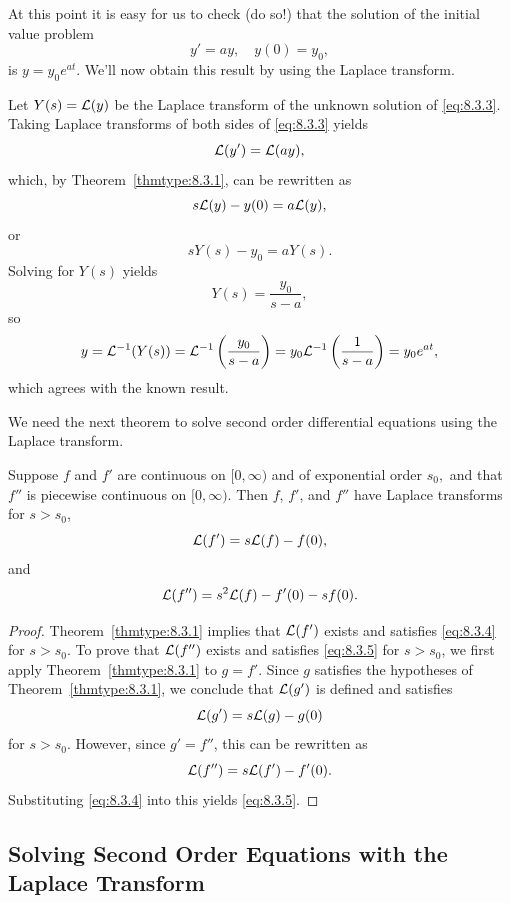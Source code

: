 \documentclass{ximera}
\begin{document}
At this point it is easy for us to check (do so!)
that the solution of the
initial value problem
\begin{equation}\label{eq:8.3.3}
y'=ay, \quad  y(0)=y_0,
\end{equation}
 is $y=y_0e^{at}$.
We'll now obtain this result by using the Laplace transform.

Let $Y(s)={\cal L}(y)$ be the Laplace transform of the unknown solution
of \eqref{eq:8.3.3}. Taking Laplace transforms of both sides of
\eqref{eq:8.3.3} yields
$$
{\cal L}(y')={\cal L}(ay),
$$
which, by Theorem~\ref{thmtype:8.3.1}, can be rewritten as
$$
s{\cal L}(y)-y(0)=a{\cal L}(y),
$$
or
$$
sY(s)-y_0=aY(s).
$$
Solving for $Y(s)$ yields
$$
Y(s)=\frac{y_0}{s-a},
$$
so
$$
y={\cal L}^{-1}(Y(s))={\cal L}^{-1}\left(\frac{y_0}{s-a}\right)=y_0{\cal
L}^{-1}\left(\frac{1}{s-a}\right)=y_0e^{at},
$$
which agrees with the known result.

We  need the next theorem to solve second order differential equations
using  the Laplace transform.

\begin{theorem}\label{thmtype:8.3.2}
Suppose $f$ and $f'$ are continuous on $[0,\infty)$ and of
exponential order $s_0,$ and that $f''$ is piecewise continuous on
$[0,\infty).$ Then $f$, $f'$, and $f''$ have Laplace transforms for $s
> s_0$,
\begin{equation}\label{eq:8.3.4}
{\cal L}(f')=s {\cal L}(f)-f(0),
\end{equation}
and
\begin{equation}\label{eq:8.3.5}
{\cal L}(f'')=s^2{\cal L}(f)-f'(0)-sf(0).
\end{equation}
\end{theorem}

\begin{proof}
Theorem~\ref{thmtype:8.3.1} implies that ${\cal L}(f')$ exists and
satisfies \eqref{eq:8.3.4} for $s>s_0$. To prove that ${\cal L}(f'')$
exists and satisfies \eqref{eq:8.3.5} for $s>s_0$, we first apply
Theorem~\ref{thmtype:8.3.1} to $g=f'$. Since $g$ satisfies the hypotheses
of Theorem~\ref{thmtype:8.3.1}, we conclude that ${\cal L}(g')$ is defined
and satisfies
$$
{\cal L}(g')=s{\cal L}(g)-g(0)
$$
for $s>s_0$. However, since $g'=f''$, this can be rewritten as
$$
{\cal L}(f'')=s{\cal L}(f')-f'(0).
$$
Substituting \eqref{eq:8.3.4} into this yields
\eqref{eq:8.3.5}.
\end{proof}

\subsection*{Solving Second Order Equations with the Laplace Transform}
\end{document}
